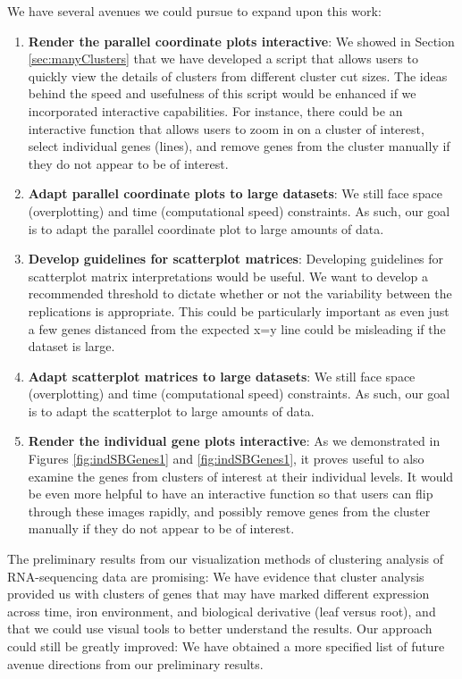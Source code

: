 \documentclass[11pt,a4paper,oldfontcommands,openany]{memoir}
\numberwithin{equation}{section} %
\begin{document}
We have several avenues we could pursue to expand upon this work:

\begin{enumerate}
\item \textbf{Render the parallel coordinate plots interactive}: We showed in Section \ref{sec:manyClusters} that we have developed a script that allows users to quickly view the details of clusters from different cluster cut sizes. The ideas behind the speed and usefulness of this script would be enhanced if we incorporated interactive capabilities. For instance, there could be an interactive function that allows users to zoom in on a cluster of interest, select individual genes (lines), and remove genes from the cluster manually if they do not appear to be of interest.

\item \textbf{Adapt parallel coordinate plots to large datasets}: We still face space (overplotting) and time (computational speed) constraints. As such, our goal is to adapt the parallel coordinate plot to large amounts of data.

\item \textbf{Develop guidelines for scatterplot matrices}: Developing guidelines for scatterplot matrix interpretations would be useful. We want to develop a recommended threshold to dictate whether or not the variability between the replications is appropriate. This could be particularly important as even just a few genes distanced from the expected x=y line could be misleading if the dataset is large.

\item \textbf{Adapt scatterplot matrices to large datasets}: We still face space (overplotting) and time (computational speed) constraints. As such, our goal is to adapt the scatterplot to large amounts of data.

\item \textbf{Render the individual gene plots interactive}: As we demonstrated in Figures \ref{fig:indSBGenes1} and \ref{fig:indSBGenes1}, it proves useful to also examine the genes from clusters of interest at their individual levels. It would be even more helpful to have an interactive function so that users can flip through these images rapidly, and possibly remove genes from the cluster manually if they do not appear to be of interest.

\end{enumerate}

The preliminary results from our visualization methods of clustering analysis of RNA-sequencing data are promising: We have evidence that cluster analysis provided us with clusters of genes that may have marked different expression across time, iron environment, and biological derivative (leaf versus root), and that we could use visual tools to better understand the results. Our approach could still be greatly improved: We have obtained a more specified list of future avenue directions from our preliminary results. 
\end{document}
